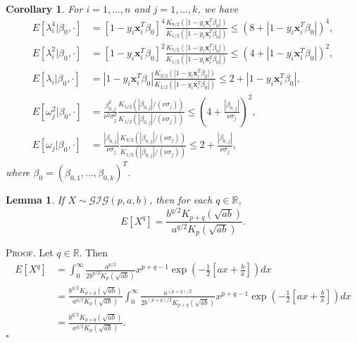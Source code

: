 \documentclass[12pt]{article}
\newtheorem{lemma}[theorem]{Lemma}
\newtheorem{corollary}[theorem]{Corollary}
\newcounter{ProofCounter}
\newenvironment{Proof}{\stepcounter{ProofCounter}\textsc{Proof.}}{\hfill$\square$}
\numberwithin{equation}{section}
\begin{document}
\begin{corollary}
  For $i = 1,\dots, n$ and $j = 1,\dots,k$, we have
  \begin{align*}
    E[\lambda_i^4|\beta_0, \cdot] & = [1 - y_i\bm{x}_i^T\beta_0]^4 \frac{K_{9/2}\left( |1 - y_i\bm{x}_i^T\beta_0| \right)}{K_{1/2}\left( |1 - y_i\bm{x}_i^T\beta_0|
    \right)} \leq \left( 8 + |1 - y_i \bm{x}_i^T \beta_0| \right)^4, \\
    E[\lambda_i^2|\beta_0, \cdot] & = [1 - y_i\bm{x}_i^T\beta_0]^2 \frac{K_{5/2}\left( |1 - y_i\bm{x}_i^T\beta_0| \right)}{K_{1/2}\left( |1 - y_i\bm{x}_i^T\beta_0|
    \right)} \leq \left( 4 + |1 - y_i \bm{x}_i^T \beta_0| \right)^2, \\
    E[\lambda_i|\beta_0, \cdot] & = |1 - y_i\bm{x}_i^T\beta_0| \frac{K_{3/2}\left( |1 - y_i\bm{x}_i^T\beta_0| \right)}{K_{1/2}\left( |1 - y_i\bm{x}_i^T\beta_0|
    \right)} \leq 2 + |1-y_i\bm{x}_i^T\beta_0|,  \\
    E[\omega_j^2|\beta_0, \cdot] & = \frac{\beta_{0,j}^2}{\nu^2 \sigma_j^2} \frac{K_{5/2}\left( |\beta_{0,j}| / (\nu\sigma_j) \right)}{ 
    K_{1/2}\left( |\beta_{0,j}| / (\nu \sigma_{j}) \right)} \leq \left( 4 + \frac{|\beta_{0,j}|}{\nu \sigma_j} \right)^2, \\
    E[\omega_j|\beta_0, \cdot] & = \frac{|\beta_{0,j}|}{\nu\sigma_j} \frac{K_{3/2}\left( |\beta_{0,j}| / (\nu\sigma_j) \right)}{ 
    K_{1/2}\left( |\beta_{0,j}| / (\nu \sigma_{j}) \right)} \leq 2 + \frac{|\beta_{0,j}|}{\nu \sigma_j},
  \end{align*}
  where $\beta_0 = (\beta_{0,1}, \dots, \beta_{0,k})^T$.
  \label{c2}
\end{corollary}


\begin{lemma}
  If $X \sim \mathcal{GIG}(p, a, b)$, then for each $q \in \mathbb{R}$,
  \[
    E[X^q] =\frac{b^{q/2}K_{p+q}(\sqrt{ab})}{a^{q/2}K_p(\sqrt{ab})}.
  \]
  \label{l5}
\end{lemma}
\begin{Proof}
  Let $q \in \mathbb{R}$. Then 
  \begin{align*}
    E[X^q] & = \int_{0}^{\infty} \frac{a^{p/2}}{2b^{p/2}K_p(\sqrt{ab})} x^{p+q-1}\exp\left( -\frac{1}{2}\left[ ax + \frac{b}{x} \right] \right)dx \\
    & = \frac{b^{q/2}K_{p+q}(\sqrt{ab})}{a^{q/2}K_p(\sqrt{ab})}
    \int_{0}^{\infty}\frac{a^{(p+q)/2}}{2b^{(p+q)/2}K_{p+q}(\sqrt{ab})} x^{p+q-1} \exp\left( -\frac{1}{2}\left[ ax + \frac{b}{x} \right] \right)dx \\
    & = \frac{b^{q/2}K_{p+q}(\sqrt{ab})}{a^{q/2}K_p(\sqrt{ab})}.
  \end{align*}
\end{Proof}
\end{document}

